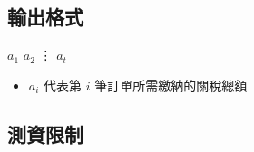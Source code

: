 \subsection{輸出格式}

\begin{format}
\f{
$a_1$
$a_2$
\vdots
$a_t$
}
\end{format}

\begin{itemize}
\tightlist
\item
  \begin{math}a_i\end{math} 代表第 \begin{math}i\end{math}
  筆訂單所需繳納的關稅總額
\end{itemize}

\subsection{測資限制}

